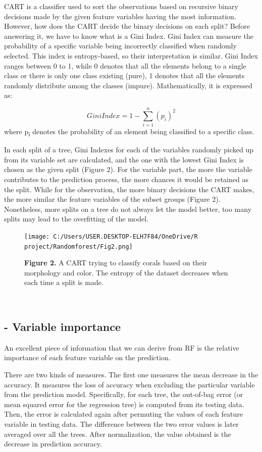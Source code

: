 \documentclass[
]{article}
\begin{document}
CART is a classifier used to sort the observations based on recursive
binary decisions made by the given feature variables having the most
information. However, how does the CART decide the binary decisions on
each split? Before answering it, we have to know what is a Gini Index.
Gini Index can measure the probability of a specific variable being
incorrectly classified when randomly selected. This index is
entropy-based, so their interpretation is similar. Gini Index ranges
between 0 to 1, while 0 denotes that all the elements belong to a single
class or there is only one class existing (pure), 1 denotes that all the
elements randomly distribute among the classes (impure). Mathematically,
it is expressed as:

\[
Gini Index=1-\sum_{i = 1}^{n}{(p_i)^2} 
\] where p\textsubscript{i} denotes the probability of an element being
classified to a specific class.

In each split of a tree, Gini Indexes for each of the variables randomly
picked up from its variable set are calculated, and the one with the
lowest Gini Index is chosen as the given split (Figure 2). For the
variable part, the more the variable contributes to the prediction
process, the more chances it would be retained as the split. While for
the observation, the more binary decisions the CART makes, the more
similar the feature variables of the subset groups (Figure 2).
Nonetheless, more splits on a tree do not always let the model better,
too many splits may lead to the overfitting of the model.

\begin{figure}
\centering
\texttt{[image: C:/Users/USER.DESKTOP-ELH7F84/OneDrive/R project/Randomforest/Fig2.png]}
\caption{\textbf{Figure 2.} A CART trying to classify corals based on
their morphology and color. The entropy of the dataset decreases when
each time a split is made.}
\end{figure}

~

\hypertarget{variable-importance}{%
\subsection{- Variable importance}\label{variable-importance}}

An excellent piece of information that we can derive from RF is the
relative importance of each feature variable on the prediction.

There are two kinds of measures. The first one measures the mean
decrease in the accuracy. It measures the loss of accuracy when
excluding the particular variable from the prediction model.
Specifically, for each tree, the out-of-bag error (or mean squared error
for the regression tree) is computed from its testing data. Then, the
error is calculated again after permuting the values of each feature
variable in testing data. The difference between the two error values is
later averaged over all the trees. After normalization, the value
obtained is the decrease in prediction accuracy.
\end{document}
